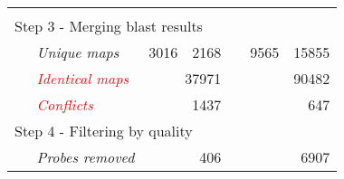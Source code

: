 \begin{table}
\begin{threeparttable}
\begin{footnotesize}
\begin{tabular}{@{}p{3cm}r|rcr|r}
	\multicolumn{6}{l}{}\\
				
		\multicolumn{6}{l}{Step 3 - Merging blast results\tnote{8}} \\[.2ex]
	{\it ~~~Unique maps\tnote{9}} & 3016 & 2168 && 9565 & 15855 \\
	{\it ~~~\textcolor{red}{Identical maps}\tnote{10}} & 
	\multicolumn{2}{r}{37971} && 
			\multicolumn{2}{r}{90482} \\
	{\it ~~~\textcolor{red}{Conflicts}\tnote{11}} & \multicolumn{2}{r}{1437} && 
			\multicolumn{2}{r}{647} \\
		[1.5ex]

	
		\multicolumn{6}{l}{Step 4 - Filtering by quality} \\[.2ex]
	{\it ~~~Probes removed\tnote{12}} & \multicolumn{2}{r}{406} && 
			\multicolumn{2}{r}{6907} \\[1.5ex]
		

\end{tabular}
\end{footnotesize}
\end{threeparttable}
\end{table}
